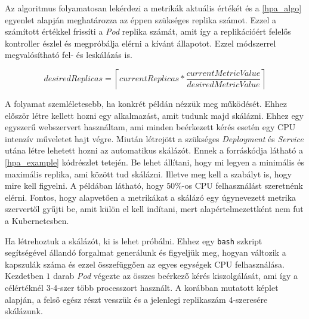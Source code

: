 Az algoritmus folyamatosan lekérdezi a metrikák aktuális értékét és a \ref{hpa_algo} egyenlet alapján meghatározza az éppen szükséges replika számot. Ezzel a számított értékkel frissíti a \textit{Pod} replika számát, amit így a replikációért felelős kontroller észlel és megpróbálja elérni a kívánt állapotot. Ezzel módszerrel megvalósítható fel- és leskálázás is.

\begin{equation}
\label{hpa_algo}
desiredReplicas = \left\lceil currentReplicas * \frac{currentMetricValue}{desiredMetricValue} \right\rceil
\end{equation}

A folyamat szemléletesebb, ha konkrét példán nézzük meg működését. Ehhez először létre kellett hozni egy alkalmazást, amit tudunk majd skálázni. Ehhez egy egyszerű webszervert használtam, ami minden beérkezett kérés esetén egy CPU intenzív műveletet hajt végre. Miután létrejött a szükséges \textit{Deployment} és \textit{Service} utána létre lehetett hozni az automatikus skálázót. Ennek a forráskódja látható a \ref{hpa_example} kódrészlet tetején. Be lehet állítani, hogy mi legyen a minimális és maximális replika, ami között tud skálázni. Illetve meg kell a szabályt is, hogy mire kell figyelni. A példában látható, hogy $50\%$-os CPU felhasználást szeretnénk elérni. Fontos, hogy alapvetően a metrikákat a skálázó egy úgynevezett metrika szervertől gyűjti be, amit külön el kell indítani, mert alapértelmezettként nem fut a Kubernetesben.

Ha létrehoztuk a skálázót, ki is lehet próbálni. Ehhez egy \verb+bash+ szkript segítségével állandó forgalmat generálunk és figyeljük meg, hogyan változik a kapszulák száma és ezzel összefüggően az egyes egységek CPU felhasználása. Kezdetben $1$ darab \textit{Pod} végezte az összes beérkező kérés kiszolgálását, ami így a célértéknél 3-4-szer több processzort használt. A korábban mutatott képlet alapján, a felső egész részt vesszük és a jelenlegi replikaszám 4-szeresére skálázunk. \\
 
\lstset{caption=Automatikus horizontális skálázás folyamata, label=hpa_example}



